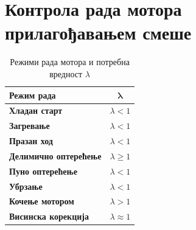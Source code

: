\documentclass[12pt]{article}
\begin{document}
\section{Контрола рада мотора прилагођавањем смеше}

\begin{table}[H]
\centering
\renewcommand{\arraystretch}{1.3}
\begin{tabular}{|l|c|}
    \hline
    \textbf{Режим рада} & $\boldsymbol{\lambda}$ \\ \hline
    \textbf{Хладан старт}         & $\lambda < 1$ \\ \hline
    \textbf{Загревање}            & $\lambda < 1$ \\ \hline
    \textbf{Празан ход}           & $\lambda < 1$ \\ \hline
    \textbf{Делимично оптерећење} & $\lambda \geq 1$ \\ \hline
    \textbf{Пуно оптерећење}      & $\lambda < 1$ \\ \hline
    \textbf{Убрзање}              & $\lambda < 1$ \\ \hline
    \textbf{Кочење мотором}       & $\lambda > 1$ \\ \hline
    \textbf{Висинска корекција}   & $\lambda \approx 1$ \\ \hline
\end{tabular}
\caption{Режими рада мотора и потребна вредност $\lambda$}
\label{tab:rezimi_lambda}
\end{table}
\end{document}
